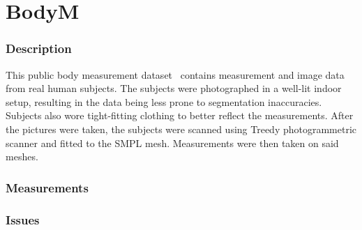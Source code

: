\section{BodyM}
\subsubsection{Description}
This public body measurement dataset~\cite{BodyM} contains measurement and image data from real human subjects. The subjects were photographed in a well-lit indoor setup, resulting in the data being less prone to segmentation inaccuracies. Subjects also wore tight-fitting clothing to better reflect the measurements. After the pictures were taken, the subjects were scanned using Treedy photogrammetric scanner and fitted to the SMPL mesh. Measurements were then taken on said meshes.
\subsubsection{Measurements}
\subsubsection{Issues}